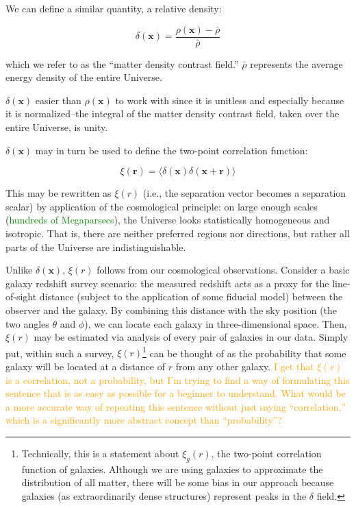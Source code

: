 
We can define a similar quantity, a relative density:

\begin{equation}
\delta(\bm{x}) = \frac{\rho(\bm{x}) - \bar{\rho}}{\bar{\rho}}
\end{equation}

which we refer to as the ``matter density contrast field.'' $\bar{\rho}$
represents the average energy density of the entire Universe.

$\delta(\bm{x})$ easier than $\rho(\bm{x})$ to work with since it
is unitless and especially because it is normalized--the integral of the
matter density contrast field, taken over the entire Universe, is unity.

$\delta(\bm{x})$ may in turn be used to define the two-point correlation 
function:

\begin{equation}
\xi(\bm{r})
=
\langle \delta (\mathbf{x}) \delta(\mathbf{x} + \mathbf{r})\rangle
\end{equation}

This may be rewritten as $\xi(r)$ (i.e., the separation vector becomes a
separation scalar) by application of the cosmological principle: on large
enough scales (\textcolor{green}{hundreds of Megaparsecs}), the Universe
looks statistically homogeneous and isotropic. That is, there are neither 
preferred regions nor directions, but rather all parts of the Universe are
indistinguishable.

Unlike $\delta(\bm{x})$, $\xi(r)$ follows from our cosmological
observations. Consider a basic galaxy redshift survey scenario: the
measured redshift acts as a proxy for the line-of-sight distance (subject to
the application of some fiducial model) between the observer and the galaxy. 
By combining this distance with the sky position (the two angles $\theta$ and
$\phi$), we can locate each galaxy in three-dimensional space. Then, $\xi(r)$ 
may be estimated via analysis of every pair of galaxies in our data. Simply
put, within such a survey, $\xi(r)$\footnote{Technically, this is a statement
about $\xi_g(r)$, the two-point correlation function of galaxies. Although we
are using galaxies to approximate the distribution of all matter, there will
be some bias in our approach because galaxies (as extraordinarily dense 
structures) represent peaks in the $\delta$ field.} can be thought
of as the probability that some galaxy will be located at a distance of $r$
from any other galaxy. \textcolor{orange}{
I get that $\xi(r)$ is a correlation, not a
probability, but I'm trying to find a way of formulating this sentence that is
as easy as possible for a beginner to understand. What would be a more
accurate way of repeating this sentence without just saying ``correlation,''
which is a significantly more abstract concept than ``probability''?}

